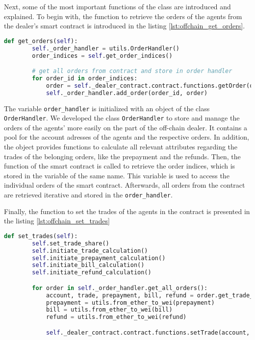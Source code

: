 Next, some of the most important functions of the class are introduced and explained.
To begin with, the function to retrieve the orders of the agents from the dealer's 
smart contract is introduced in the listing \ref{lst:offchain_get_orders}.

\begin{lstlisting}[float=htbp, label=lst:offchain_get_orders, caption=Overview of the off-chain dealer's class attributes, language=Python]
    def get_orders(self):
        self._order_handler = utils.OrderHandler()
        order_indices = self.get_order_indices()

        # get all orders from contract and store in order handler
        for order_id in order_indices:
            order = self._dealer_contract.contract.functions.getOrder(order_id).call()
            self._order_handler.add_order(order_id, order)
\end{lstlisting}

The variable \verb|order_handler| is initialized with an object of the class \verb|OrderHandler|.
We developed the class \verb|OrderHandler| to store and manage the orders of the agents' more easily
on the part of the off-chain dealer.
It contains a pool for the account adresses of the agents and the 
respective orders. In addition, the object provides functions to 
calculate all relevant attributes regarding the trades of the belonging orders, 
like the prepayment and the refunds.
Then, the function of the smart contract is called to retrieve the order indices,
which is stored in the variable of the same name. This variable is used to 
access the individual orders of the smart contract.
Afterwards, all orders from the contract are retrieved iterative and stored in the \verb|order_handler|.

Finally, the function to set the trades of the agents in the contract is presented in the listing \ref{lst:offchain_set_trades}

\begin{lstlisting}[float=htbp, label=lst:offchain_set_trades, caption=Submitment of trades, language=Python]
    def set_trades(self):
        self.set_trade_share()
        self.initiate_trade_calculation()
        self.initiate_prepayment_calculation()
        self.initiate_bill_calculation()
        self.initiate_refund_calculation()

        for order in self._order_handler.get_all_orders():
            account, trade, prepayment, bill, refund = order.get_trade_information()
            prepayment = utils.from_ether_to_wei(prepayment)
            bill = utils.from_ether_to_wei(bill)
            refund = utils.from_ether_to_wei(refund)

            self._dealer_contract.contract.functions.setTrade(account, trade, prepayment, bill, refund).transact({'from': self._account_address})
\end{lstlisting}


